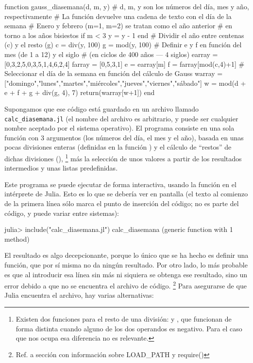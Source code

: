 ﻿\documentclass[spanish]{article}
\begin{document}
function gauss_diasemana(d, m, y)
# d, m, y son los números del día, mes y año, respectivamente
# La función devuelve una cadena de texto con el día de la semana
  # Enero y febrero (m=1, m=2) se tratan como el año anterior
  # en torno a los años bisiestos
  if m < 3
    y = y - 1
  end
  # Dividir el año entre centenas (c) y el resto (g)
  c = div(y, 100)
  g = mod(y, 100)
  # Definir e y f en función del mes (de 1 a 12) y el siglo
  # (en ciclos de 400 años --- 4 siglos)
  earray = [0,3,2,5,0,3,5,1,4,6,2,4]
  farray = [0,5,3,1]
  e = earray[m]
  f = farray[mod(c,4)+1]
  # Seleccionar el día de la semana en función del cálculo de Gauss
  warray = ["domingo","lunes","martes","miércoles","jueves","viernes","sábado"]
  w = mod(d + e + f + g + div(g, 4), 7)
  return(warray[w+1])
end

Supongamos que ese código está guardado en un archivo llamado \texttt{calc_diasemana.jl} (el nombre del archivo es arbitrario, y puede ser cualquier nombre aceptado por el sistema operativo). El programa consiste en una sola función con 3 argumentos (los números del día, el mes y el año), basada en unas pocas divisiones enteras (definidas en la función ) y el cálculo de ``restos'' de dichas divisiones (),%
\footnote{%
Existen dos funciones para el resto de una división:  y , que funcionan de forma distinta cuando alguno de los dos operandos es negativo. Para el caso que nos ocupa esa diferencia no es relevante.%
}
más la selección de unos valores a partir de los resultados intermedios y unas listas predefinidas.

Este programa se puede ejecutar de forma interactiva, usando la función  en el intérprete de Julia. Esto es lo que se debería ver en pantalla (el texto  al comienzo de la primera línea sólo marca el punto de inserción del código; no es parte del código, y puede variar entre sistemas):

julia> include("calc_diasemana.jl")
calc_diasemana (generic function with 1 method)

El resultado es algo decepcionante, porque lo único que se ha hecho es definir una función, que por sí misma no da ningún resultado. Por otro lado, lo más probable es que al introducir esa línea sin más ni siquiera se obtenga ese resultado, sino un error debido a que no se encuentra el archivo de código.%
\footnote{%
Ref. a sección con información sobre LOAD\_PATH y require()%
}
Para asegurarse de que Julia encuentra el archivo,
hay varias alternativas:
\end{document}
